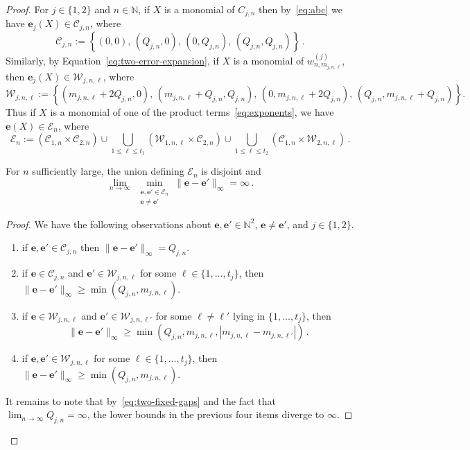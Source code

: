 \documentclass[a4paper,UKenglish,cleveref, autoref, thm-restate]{lipics-v2021}
\begin{document}
\begin{proof}
For \(j\in\{1,2\}\) and \(n\in \mathbb N\), if $X$ is a monomial of $C_{j,n}$ then by~\eqref{eq:abc} we have
$\mathbf e_j(X) \in \mathcal C_{j,n}$, where 
\[
 \mathcal C_{j,n}
  :=
  \left\{
    (0,0),\,
    (Q_{j,n},0),\,
    (0,Q_{j,n}),\,
    (Q_{j,n},Q_{j,n})
  \right\} \, .
\]
Similarly, by Equation~\eqref{eq:two-error-expansion}, if $X$ is a monomial of $w_{n,m_{j,n,\ell}}^{(j)}$, then $\mathbf e_j(X)\in \mathcal W_{j,n,\ell}$, where
\[
  \mathcal W_{j,n,\ell}
  :=
  \left\{
    (m_{j,n,\ell}+2Q_{j,n},0),\,
    (m_{j,n,\ell}+Q_{j,n},Q_{j,n}),\,
    (0,m_{j,n,\ell}+2Q_{j,n}),\,
    (Q_{j,n},m_{j,n,\ell}+Q_{j,n})
  \right\}.
\]
Thus if $X$ is a  monomial of one of the product terms~\eqref{eq:exponents}, we have $\mathbf e(X)\in\mathcal E_n$, where
\[ \mathcal E_n:=
  (\mathcal C_{1,n}\times\mathcal C_{2,n})\cup 
  \bigcup_{1\le\ell\le t_1} (\mathcal W_{1,n,\ell}\times\mathcal C_{2,n})
  \cup \bigcup_{1\le\ell\le t_2}
  (\mathcal C_{1,n}\times\mathcal W_{2,n,\ell})\, .
\]

\begin{claim}
For $n$ sufficiently large, the union defining $\mathcal E_n$ is disjoint and 
\[ \displaystyle \lim_{n\rightarrow \infty} \, \displaystyle \min_{\substack{\boldsymbol e,\boldsymbol e' \in \mathcal E_n\\
\boldsymbol e\neq \boldsymbol e'}} 
\|\boldsymbol e-\boldsymbol e'\|_\infty =\infty \, .\]
\label{claim:two-exponent-separation}
\end{claim}
\begin{proof}
We have the following observations about $\boldsymbol e,\boldsymbol e'\in \mathbb N^2$, $\boldsymbol e\neq \boldsymbol e'$,
and $j\in\{1,2\}$.  
\begin{enumerate}
    \item if $\boldsymbol e,\boldsymbol e' \in \mathcal C_{j,n}$ then $\|\boldsymbol e-\boldsymbol e' \|_\infty = Q_{j,n}$.
    \item if $\boldsymbol e \in \mathcal C_{j,n}$ and $\boldsymbol e' \in\mathcal W_{j,n,\ell}$
for some $\ell\in\{1,\ldots,t_j\}$, then 
\( \|\boldsymbol e-\boldsymbol e' \|_\infty \geq \min(Q_{j,n},m_{j,n,\ell})\).
\item if $\boldsymbol e \in \mathcal W_{j,n,\ell}$ and  
$\boldsymbol e' \in \mathcal W_{j,n,\ell'}$ for some $\ell\neq \ell'$ lying in $\{1,\ldots,t_j\}$, then 
\[ \|\boldsymbol e-\boldsymbol e' \|_\infty \geq \min(Q_{j,n},m_{j,n,\ell},|m_{j,n,\ell} - m_{j,n,\ell'}|) \, .
\]
\item if  $\boldsymbol e, \boldsymbol e' \in \mathcal W_{j,n,\ell}$ for some $\ell \in \{1,\ldots,t_j\}$,
then 
\(\|\boldsymbol e-\boldsymbol e' \|_\infty \geq \min(Q_{j,n},m_{j,n,\ell})\).
\end{enumerate}
It remains to note that by~\eqref{eq:two-fixed-gaps} and the fact that $\lim_{n\rightarrow\infty} Q_{j,n}=\infty$, the lower bounds 
in the previous four items diverge to $\infty$.
\end{proof}


\end{proof}
\end{document}
